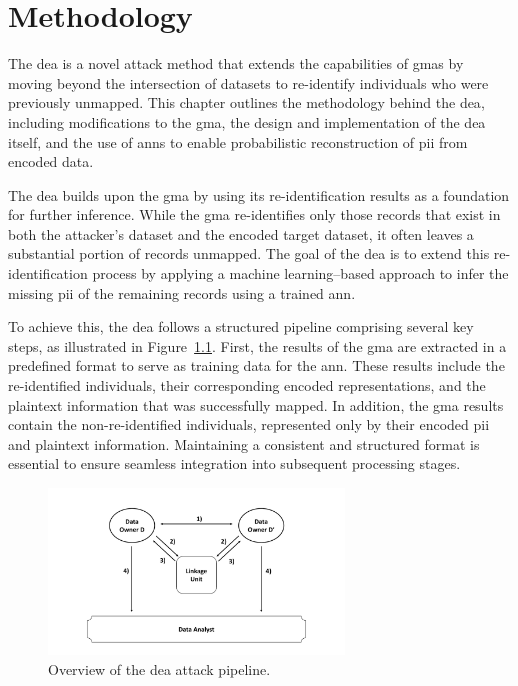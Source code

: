\chapter{Methodology}  \label{sec:method}
The \ac{dea} is a novel attack method that extends the capabilities of \ac{gma}s by moving beyond the intersection of datasets to re-identify individuals who were previously unmapped.
This chapter outlines the methodology behind the \ac{dea}, including modifications to the \ac{gma}, the design and implementation of the \ac{dea} itself, and the use of \ac{ann}s to enable probabilistic reconstruction of \ac{pii} from encoded data.

The \ac{dea} builds upon the \ac{gma} by using its re-identification results as a foundation for further inference.
While the \ac{gma} re-identifies only those records that exist in both the attacker’s dataset and the encoded target dataset, it often leaves a substantial portion of records unmapped.
The goal of the \ac{dea} is to extend this re-identification process by applying a machine learning–based approach to infer the missing \ac{pii} of the remaining records using a trained \ac{ann}.

To achieve this, the \ac{dea} follows a structured pipeline comprising several key steps, as illustrated in Figure~\ref{fig:deaoverview}.
First, the results of the \ac{gma} are extracted in a predefined format to serve as training data for the \ac{ann}.
These results include the re-identified individuals, their corresponding encoded representations, and the plaintext information that was successfully mapped.
In addition, the \ac{gma} results contain the non-re-identified individuals, represented only by their encoded \ac{pii} and plaintext information.
Maintaining a consistent and structured format is essential to ensure seamless integration into subsequent processing stages.

\begin{figure}[H]
    \centering
    \includegraphics[width=0.7\textwidth, page=14]{img/visualization.pdf}
    \caption{Overview of the \ac{dea} attack pipeline.}
    \label{fig:deaoverview}
  \end{figure}

